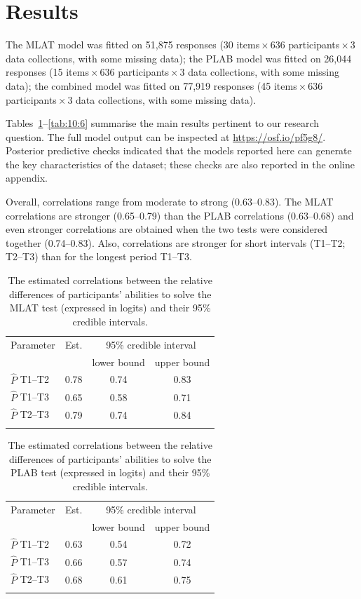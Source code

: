 \documentclass[output=paper]{langsci/langscibook}
\begin{document}
\section{Results}

The MLAT model was fitted on 51,875 responses (30 items\,×\,636 participants\,×\,3 data collections, with some missing data); the PLAB model was fitted on 26,044 responses (15 items\,×\,636 participants\,×\,3 data collections, with some missing data); the combined model was fitted on 77,919 responses (45 items\,×\,636 participants\,×\,3 data collections, with some missing data).

Tables~\ref{tab:10:4}--\ref{tab:10:6} summarise the main results pertinent to our research question. The full model output can be inspected at \url{https://osf.io/pf5g8/}. Posterior predictive checks indicated that the models reported here can generate the key characteristics of the dataset; these checks are also reported in the online appendix.

Overall, correlations range from moderate to strong (0.63--0.83). The MLAT correlations are stronger (0.65--0.79) than the PLAB correlations (0.63--0.68) and even stronger correlations are obtained when the two tests were considered together (0.74--0.83). Also, correlations are stronger for short intervals (T1--T2; T2--T3) than for the longest period T1--T3. 

\begin{table}[p]
\caption{\label{tab:10:4}The estimated correlations between the relative differences of participants’ abilities to solve the MLAT test (expressed in logits) and their 95\% credible intervals.}
\begin{tabular}{lccc}
\lsptoprule
Parameter & Est. & \multicolumn{2}{c}{95\% credible interval}\\\cmidrule(lr){3-4}
          &      & lower bound & upper bound\\\midrule
$\hat{P}$ T1--T2 & 0.78 & 0.74 & 0.83\\
$\hat{P}$ T1--T3 & 0.65 & 0.58 & 0.71\\
$\hat{P}$ T2--T3 & 0.79 & 0.74 & 0.84\\
\lspbottomrule
\end{tabular}
\end{table}


\begin{table}[p]
\caption{\label{tab:10:5}The estimated correlations between the relative differences of participants’ abilities to solve the PLAB test (expressed in logits) and their 95\% credible intervals.}
\begin{tabular}{lccc}
\lsptoprule
Parameter & Est. & \multicolumn{2}{c}{95\% credible interval}\\\cmidrule(lr){3-4}
          &      & lower bound & upper bound\\\midrule
$\hat{P}$ T1--T2 & 0.63 & 0.54 & 0.72\\
$\hat{P}$ T1--T3 & 0.66 & 0.57 & 0.74\\
$\hat{P}$ T2--T3 & 0.68 & 0.61 & 0.75\\
\lspbottomrule
\end{tabular}
\end{table}
\end{document}
